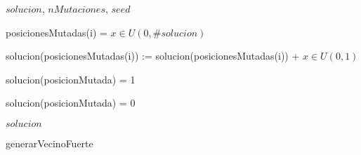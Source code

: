 \documentclass{article}
\begin{document}
\begin{algorithm}
\begin{algorithmic}[1]
    \REQUIRE $solucion$, $nMutaciones$, $seed$

	\REPEAT
		\STATE posicionesMutadas(i) = $x \in U(0,\#solucion)$

	solucion(posicionesMutadas(i)) := solucion(posicionesMutadas(i)) + $x \in U(0,1)$
   

		\STATE solucion(posicionMutada) = 1 
	    \ENDIF

		\STATE solucion(posicionMutada) = 0 
	    \ENDIF
	\ENDFOR

    \RETURN $solucion$
\end{algorithmic}
\caption{generarVecinoFuerte}
\end{algorithm}
\end{document}
